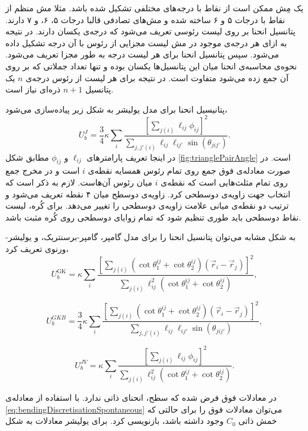 یک مِش ممکن است از نقاط با درجه‌های مختلفی تشکیل شده باشد. مثلا مش منظم از نقاط با درجات ۵ و ۶ ساخته شده و مش‌های تصادفی قالبا درجات ۵، ۶، و ۷ دارند. پتانسیل انحنا بر روی لیست رئوسی تعریف می‌شود که درجه‌ی یکسان دارند. در نتیجه به ازای هر درجه‌ی موجود در مش  لیست مجزایی از رئوس با آن درجه تشکیل داده می‌شود. سپس پتانسیل انحنا برای هر لیست درجه به طور مجزا تعریف می‌شود. نحوه‌ی محاسبه‌ی انحنا میان این پتانسیل‌ها یکسان بوده و تنها تعداد جملاتی که بر روی آن جمع زده می‌شود متفاوت است. در نتیجه برای هر لیست از رئوس درجه‌ی 
$n$
یک پتانسیل 
$n+1$
ذره‌ای نیاز است.


پتانیسیل  انحنا برای مدل یولیشر به شکل زیر پیاده‌سازی می‌شود،
\begin{equation}
U_b^J=\frac{3}{4}\kappa\sum_i\frac{\left[\sum_{j(i)}\ell_{ij}\phi_{ij}\right]^2}{\sum_{j,j'(i)}\ell_{ij}\ell_{ij'}\sin(\theta_{jij'})}.
\label{eq:UbJDiscrete}
\end{equation}
در اینجا تعریف پارامتر‌های 
$\ell_{ij}$
و
$\phi_{ij}$
مطابق شکل 
\ref{fig:trianglePairAngle}
است. در صورت معادله‌ی فوق جمع روی تمام رئوس همسایه نقطه‌ی 
$i$
است و در مخرج جمع روی تمام مثلث‌هایی است که نقطه‌ی 
$i$
میان رئوس آن‌هاست. لازم به ذکر است که انتخاب جهت زاویه‌ی دوسطحی کرد. زاویه‌ی دوسطح میان ۴ نقطه تعریف می‌شود و ترتیب دو نقطه‌ی میانی علامت زاویه‌ی دوسطحی را تغییر می‌دهد. برای کُره، لیست نقاط دوسطحی باید طوری تنظیم شود که تمام زوایای دوسطحی روی کُره مثبت باشد.

به شکل مشابه می‌توان پتانسیل انحنا را برای مدل گامپر، گامپر-برسنتریک، و یولیشر-ورنوی تعریف کرد،
\begin{equation}
U_b^\text{GK}=\kappa\sum_i\frac{\left[\sum_{j(i)}(\cot\theta_1^{ij}+\cot\theta_2^{ij})(\vec r_i-\vec r_j)\right]^2}{\sum_{j(i)}\ell_{ij}^2(\cot\theta_1^{ij}+\cot\theta_2^{ij})},
\label{eq:UbGKDiscrete}
\end{equation}

\begin{equation}
U_b^{GKB}=\frac{3}{4}\kappa\sum_i\frac{\left[\sum_{j(i)}(\cot\theta_1^{ij}+\cot\theta_2^{ij})(\vec r_i-\vec r_j)\right]^2}{\sum_{j,j'(i)}\ell_{ij}\ell_{ij'}\sin(\theta_{jij'})},
\end{equation}

\begin{equation}
U_b^{JV}=\kappa\sum_i\frac{\left[\sum_{j(i)}\ell_{ij}\phi_{ij}\right]^2}{\sum_{j(i)}\ell_{ij}^2(\cot\theta_1^{ij}+\cot\theta_2^{ij})}.
\end{equation}

در معادلات فوق فرض شده که سطح، انحنای ذاتی ندارد. با استفاده از معادله‌ی 
\ref{eq:bendingDiscretisationSpontaneous}
می‌توان معادلات فوق را برای حالتی که خمش ذاتی 
$C_0$
وجود داشته باشد، بازنویسی کرد. برای یولیشر معادلات به شکل

